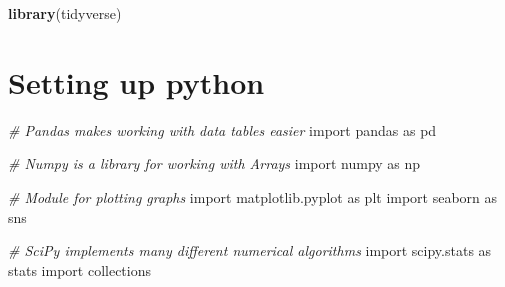 \documentclass[]{book}
\newenvironment{Shaded}{\begin{snugshade}}{\end{snugshade}}
\newcommand{\KeywordTok}[1]{\textcolor[rgb]{0.13,0.29,0.53}{\textbf{#1}}}
\newcommand{\CommentTok}[1]{\textcolor[rgb]{0.56,0.35,0.01}{\textit{#1}}}
\newcommand{\NormalTok}[1]{#1}
\begin{document}
\begin{Shaded}
\begin{Highlighting}[]
\KeywordTok{library}\NormalTok{(tidyverse)}
\end{Highlighting}
\end{Shaded}

\chapter{Setting up python}\label{appendixB}

\begin{Shaded}
\begin{Highlighting}[]
\CommentTok{# Pandas makes working with data tables easier}
\NormalTok{import pandas as pd}

\CommentTok{# Numpy is a library for working with Arrays}
\NormalTok{import numpy as np}

\CommentTok{# Module for plotting graphs}
\NormalTok{import matplotlib.pyplot as plt}
\NormalTok{import seaborn as sns}

\CommentTok{# SciPy implements many different numerical algorithms}
\NormalTok{import scipy.stats as stats}
\NormalTok{import collections}
\end{Highlighting}
\end{Shaded}


\end{document}
